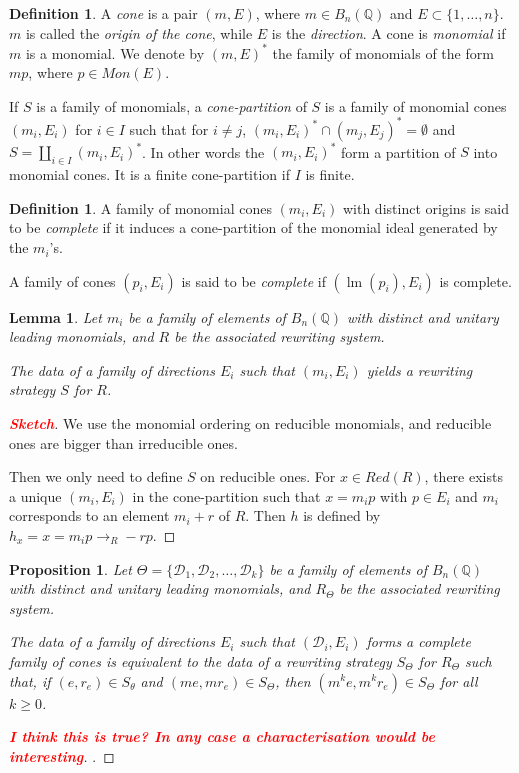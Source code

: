 \documentclass[10pt]{easychair}
\newtheorem{lemma}[theorem]{Lemma}
\newtheorem{proposition}[theorem]{Proposition}
\theoremstyle{definition}
\newtheorem{definition}[theorem]{Definition}
\newcommand\todo[1]{{\bf\textcolor{red}{#1}}}
\newcommand\D{\mathcal{D}}
\DeclareMathOperator{\lm}{lm}
\newcommand\Q{\mathbb{Q}}
\newcommand\Weyl[1]{B_{#1}(\Q)}
\newcommand\rewR{\to_R}
\begin{document}
\begin{definition}
  A \emph{cone} is a pair $(m,E)$, where $m \in \Weyl n$ and $E \subset \{1,\ldots,n\}$.
  $m$ is called the \emph{origin of the cone}, while $E$
  is the \emph{direction}. A cone is \emph{monomial} if $m$ is a monomial.
  We denote by $(m,E)^*$ the family of monomials of the form $mp$,
  where $p \in Mon(E)$.

  If $S$ is a family of monomials, a \emph{cone-partition} of $S$ is a family
  of monomial cones $(m_i,E_i)$ for $i \in I$ such that for $i \neq j$,
  $(m_i,E_i)^* \cap (m_j,E_j)^* = \emptyset$ and $S = \coprod_{i \in I} (m_i,E_i)^*$.
  In other words the $(m_i,E_i)^*$ form a partition of $S$ into monomial cones.
  It is a finite cone-partition if $I$ is finite.
\end{definition}


 \begin{definition}
   A family of monomial cones $(m_i,E_i)$ with distinct origins is said
   to be \emph{complete} if it induces a cone-partition of the monomial ideal
   generated by the $m_i$'s. 

   A family of cones $(p_i,E_i)$ is said to be \emph{complete}
   if $(\lm(p_i),E_i)$ is complete. 
 \end{definition}

 \begin{lemma}
   Let $m_i$ be a family of elements of $\Weyl n$ with distinct and unitary
   leading monomials, and $R$ be the associated rewriting system.
   
   The data of a family of directions $E_i$ such that $(m_i,E_i)$ yields a
   rewriting strategy $S$ for $R$.
\end{lemma}
\begin{proof}[\todo{Sketch}]
  We use the monomial ordering on reducible monomials,
  and reducible ones are bigger than irreducible ones.

  Then we only need to define $S$ on reducible ones. For $x \in Red(R)$,
  there exists a unique $(m_i,E_i)$ in the cone-partition such that $x=m_i p$
  with $p \in E_i$ and $m_i$ corresponds to an element $m_i + r$ of $R$.
  Then $h$ is defined by $h_x = x = m_ip  \rewR -rp$.
\end{proof}



 \begin{proposition}
   Let $\Theta = \{ \D_1, \D_2, \ldots, \D_k\}$ be a family of elements of $\Weyl n$ with distinct and unitary
   leading monomials, and $R_\Theta$ be the associated rewriting system.
   
   The data of a family of directions $E_i$ such that $(\D_i,E_i)$ forms a complete
   family of cones is equivalent to the data of a rewriting strategy $S_\Theta$ for $R_\Theta$
   such that, if $(e,r_e) \in S_\theta$ and $(me,mr_e) \in S_\Theta$,
   then $(m^k e,m^k r_e) \in S_\Theta$ for all $k \geq 0$.
 \end{proposition}
 \begin{proof}[\todo{I think this is true? In any case a characterisation would be interesting}].

 \end{proof}
\end{document}
